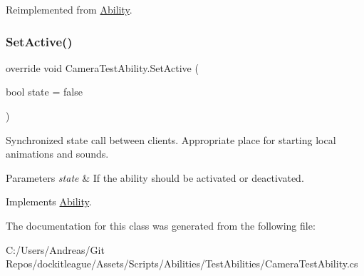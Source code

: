 Reimplemented from \hyperlink{class_ability_ae8217a23a940c9ce450e827856d7020b}{Ability}.

\hypertarget{class_camera_test_ability_ac0e1ec197c4123a84508d5cfb209336c}{}\label{class_camera_test_ability_ac0e1ec197c4123a84508d5cfb209336c} 
\subsubsection{\texorpdfstring{Set\+Active()}{SetActive()}}
{\footnotesize\ttfamily override void Camera\+Test\+Ability.\+Set\+Active (\begin{DoxyParamCaption}\item[{bool}]{state = {\ttfamily false} }\end{DoxyParamCaption})\hspace{0.3cm}{\ttfamily [virtual]}}



Synchronized state call between clients. Appropriate place for starting local animations and sounds. 


\begin{DoxyParams}{Parameters}
{\em state} & If the ability should be activated or deactivated.\\
\hline
\end{DoxyParams}


Implements \hyperlink{class_ability_a10f7f3c2b63eeef6e352aee48d246384}{Ability}.



The documentation for this class was generated from the following file\+:\begin{DoxyCompactItemize}
\item 
C\+:/\+Users/\+Andreas/\+Git Repos/dockitleague/\+Assets/\+Scripts/\+Abilities/\+Test\+Abilities/Camera\+Test\+Ability.\+cs\end{DoxyCompactItemize}
